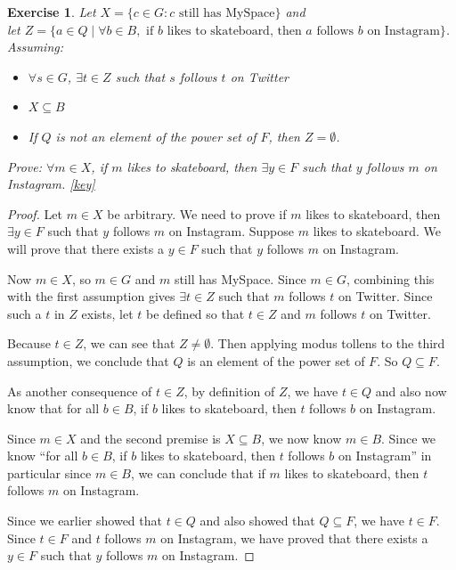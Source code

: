 \documentclass{book}
\newcounter{ekcounter}%
\theoremstyle{ekimcustom}
\newtheorem{exercise}[ekcounter]{Exercise}
\begin{document}
\begin{exercise}
Let $X = \{c \in G: c \text{ still has MySpace}\}$ and\\let $Z=\{a \in Q \mid \forall b \in B, \text{ if } b \text{ likes to skateboard, then } a \text{ follows } b \text{ on Instagram}\}$. Assuming:
\begin{itemize}
\item $\forall s \in G$, $\exists t \in Z$ such that $s$ follows $t$ on Twitter
\item $X \subseteq B$
\item If $Q$ is not an element of the power set of $F$, then $Z = \emptyset$.
\end{itemize}
Prove: $\forall m \in X$, if $m$ likes to skateboard, then $\exists y \in F$ such that $y$ follows $m$ on Instagram. \quad\href{https://www.sharelatex.com/project/59ea2690c26a0a7656184823}{{\color{red}[key]}}
\end{exercise}
\begin{proof}
Let $m \in X$ be arbitrary. We need to prove if $m$ likes to skateboard, then $\exists y \in F$ such that $y$ follows $m$ on Instagram. Suppose $m$ likes to skateboard. We will prove that there exists a $y \in F$ such that $y$ follows $m$ on Instagram.

Now $m \in X$, so $m \in G$ and $m$ still has MySpace. Since $m \in G$, combining this with the first assumption gives $\exists t \in Z$ such that $m$ follows $t$ on Twitter. Since such a $t$ in $Z$ exists, let $t$ be defined so that $t \in Z$ and $m$ follows $t$ on Twitter.

Because $t \in Z$, we can see that $Z \not= \emptyset$. Then applying modus tollens to the third assumption, we conclude that $Q$ is an element of the power set of $F$. So $Q \subseteq F$.

As another consequence of $t \in Z$, by definition of $Z$, we have $t \in Q$ and also now know that for all $b \in B$, if $b$ likes to skateboard, then $t$ follows $b$ on Instagram.

Since $m \in X$ and the second premise is $X \subseteq B$, we now know $m \in B$. Since we know ``for all $b \in B$, if $b$ likes to skateboard, then $t$ follows $b$ on Instagram'' in particular since $m \in B$, we can conclude that if $m$ likes to skateboard, then $t$ follows $m$ on Instagram.

Since we earlier showed that $t \in Q$ and also showed that $Q \subseteq F$, we have $t \in F$. Since $t \in F$ and $t$ follows $m$ on Instagram, we have proved that there exists a $y \in F$ such that $y$ follows $m$ on Instagram.
\end{proof}
\end{document}
